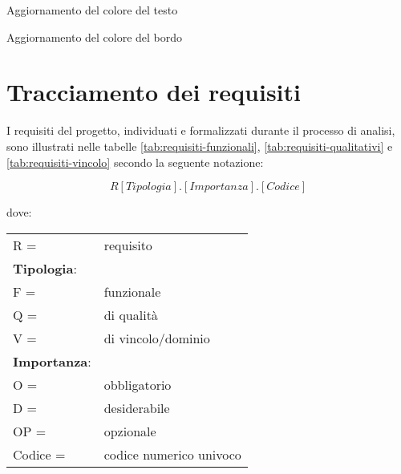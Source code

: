 \begin{usecase}{23.2}{Aggiornamento del colore del testo}\label{UC23point2}
\end{usecase}

\begin{usecase}{23.3}{Aggiornamento del colore del bordo}\label{UC23point3}
\end{usecase}

\newpage

\section{Tracciamento dei requisiti}
\par I \gls{requisiti} del progetto, individuati e formalizzati durante il processo di analisi, sono illustrati nelle tabelle \ref{tab:requisiti-funzionali}, \ref{tab:requisiti-qualitativi} e \ref{tab:requisiti-vincolo} secondo la seguente notazione:
\par \textbf{\[R[Tipologia].[Importanza].[Codice]\]} 
\par dove:
\par\vspace{20pt}
\begin{tabular}{@{}ll@{}}
    R = & requisito \\
    \textbf{Tipologia}: & \\
    \quad F = & funzionale \\
    \quad Q = & di qualità \\
    \quad V = & di vincolo/dominio \\
    \textbf{Importanza}: & \\
    \quad O = & obbligatorio \\
    \quad D = & desiderabile \\  
    \quad OP = & opzionale \\
    Codice = & codice numerico univoco \\
\end{tabular}
    
